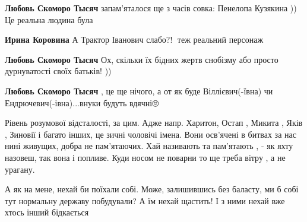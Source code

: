 \begin{itemize}
\begin{itemize}
\textbf{Любовь Скоморо Тысяч} запам'яталося ще з часів совка: Пенелопа Кузякина )) Це реальна людина була

 
\textbf{Ирина Коровина}
А Трактор Іванович слабо?!🤣 теж реальний персонаж

 
\textbf{Любовь Скоморо Тысяч} Ох, скільки їх бідних жертв снобізму або просто дурнуватості своїх батьків! ))

 
\textbf{Любовь Скоморо Тысяч} , це ще нічого, а от як буде Віллієвич(-ївна) чи Ендрючевич(-івна)...внуки будуть вдячні🙄🤔😣
\end{itemize}

 

Рівень розумової відсталості, за цим. Адже напр. Харитон, Остап , Микита , Яків
, Зиновії і багато інших, це зичні чоловічі імена. Вони осв'ячені в битвах за
нас нині живущих, добра не пам'ятаючих. Хай називають та пам'ятають , - як яхту
назовеш, так вона і попливе. Куди носом не поварни то ще треба вітру , а не
урагану.


 

А як на мене, нехай би поїхали собі. Може, залишившись без баласту, ми б собі
тут нормальну державу побудували? А їм нехай щастить! І з ними нехай вже хтось
інший бідкається


\end{itemize}
